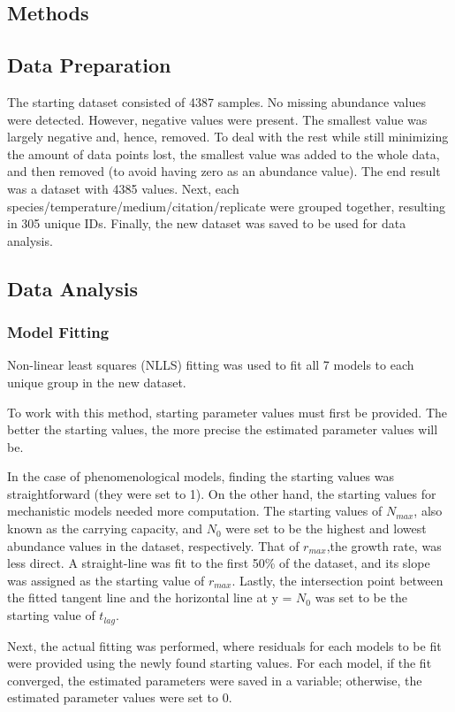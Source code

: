 \documentclass[11pt]{article}
\begin{document}
\begin{linenumbers}
	\section{Methods}
	\subsection{Data Preparation}
	The starting dataset consisted of 4387 samples. No missing abundance values were detected. However, negative values were present. The smallest value was largely negative and, hence, removed. To deal with the rest while still minimizing the amount of data points lost, the smallest value was added to the whole data, and then removed (to avoid having zero as an abundance value). The end result was a dataset with 4385 values.
	Next, each species/temperature/medium/citation/replicate were grouped together, resulting in 305 unique IDs. Finally, the new dataset was saved to be used for data analysis.

	\subsection{Data Analysis}
	\subsubsection{Model Fitting}
	Non-linear least squares (NLLS) fitting was used to fit all 7 models to each unique group in the new dataset. 
	\par To work with this method, starting parameter values must first be provided. The better the starting values, the more precise the estimated parameter values will be.
	\par In the case of phenomenological models, finding the starting values was straightforward (they were set to 1). On the other hand, the starting values for mechanistic models needed more computation. The starting values of $N_{max}$, also known as the carrying capacity, and $N_0$ were set to be the highest and lowest abundance values in the dataset, respectively. That of $r_{max}$,the growth rate, was less direct. A straight-line was fit to the first 50\% of the dataset, and its slope was assigned as the starting value of $r_{max}$. Lastly, the intersection point between the fitted tangent line and the horizontal line at y = $N_0$ was set to be the starting value of $t_{lag}$.
	\par Next, the actual fitting was performed, where residuals for each models to be fit were provided using the newly found starting values. For each model, if the fit converged, the estimated parameters were saved in a variable; otherwise, the estimated parameter values were set to 0. 

\end{linenumbers}
\end{document}
